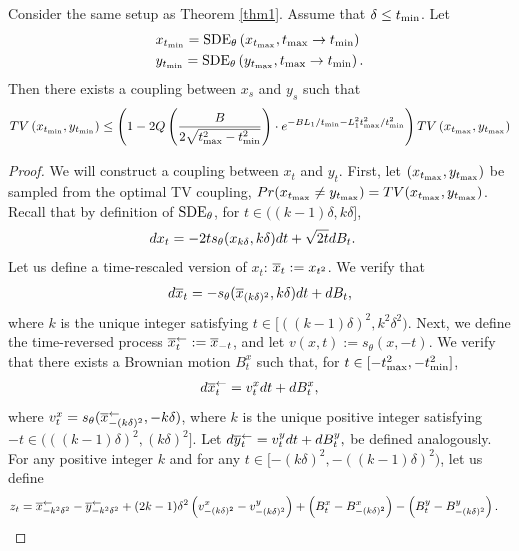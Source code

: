 \begin{lemma}
    \label{l:sde_hitting_time}
    Consider the same setup as Theorem \ref{thm1}. Assume that $\delta \leq t_{\textrm{min}}$. Let
    \begin{align*}
        & x_{t_{\textrm{min}}} = {\textrm{SDE}_\theta}\left( x_{t_{\textrm{max}}}, t_{\textrm{max}} \to t_{\textrm{min}} \right)\\
        & y_{t_{\textrm{min}}} = {\textrm{SDE}_\theta}\left( y_{t_{\textrm{max}}}, t_{\textrm{max}} \to t_{\textrm{min}} \right).
    \end{align*}
    Then there exists a coupling between $x_s$ and $y_s$ such that 
    \begin{align*}
        TV\left( x_{t_{\textrm{min}}}, y_{t_{\textrm{min}}} \right) \leq \left( 1-2Q\left( \frac{B}{2\sqrt{t_{\textrm{max}}^2 - t_{\textrm{min}}^2}} \right) \cdot e^{-BL_1/t_{\textrm{min}} - L_1^2 t_{\textrm{max}}^2 / t_{\textrm{min}}^2} \right) TV\left( x_{t_{\textrm{max}}}, y_{t_{\textrm{max}}} \right)
    \end{align*}
\end{lemma}
\begin{proof}
    We will construct a coupling between $x_t$ and $y_t$. First, let $(x_{t_{\textrm{max}}}, y_{t_{\textrm{max}}})$ be sampled from the optimal TV coupling, \ie $Pr(x_{t_{\textrm{max}}} \neq y_{t_{\textrm{max}}}) = TV(x_{t_{\textrm{max}}}, y_{t_{\textrm{max}}})$. Recall that by definition of ${\textrm{SDE}_\theta}$, for $t\in((k-1)\delta, k\delta]$,
    \begin{align*}
        & d x_t = - 2 t s_{\theta}(x_{k\delta}, k\delta) dt + \sqrt{2t} dB_t.
    \end{align*}
    Let us define a time-rescaled version of $x_t$: $\overline{x}_{t} := x_{t^2}$. We verify that
    \begin{align*}
        d \overline{x}_t = - s_{\theta}(\overline{x}_{(k\delta)^2}, k\delta) dt + dB_t,
    \end{align*}
    where $k$ is the unique integer satisfying $t \in[((k-1)\delta)^2, k^2\delta^2)$.
    Next, we define the time-reversed process $\overline{x}^{\leftarrow}_t:= \overline{x}_{-t}$, and let $v(x,t) := s_{\theta}(x,-t)$. We verify that there exists a Brownian motion $B^x_t$ such that, for $t\in[-t_{\textrm{max}}^2, -t_{\textrm{min}}^2]$,
    \begin{align*}
        d \overline{x}^{\leftarrow}_t = v^x_t dt + dB^x_t,
    \end{align*}
    where $v^x_t = s_{\theta} (\overline{x}^{\leftarrow}_{-(k\delta)^2}, -k\delta)$, where $k$ is the unique positive integer satisfying $-t \in(((k-1)\delta)^2, (k\delta)^2]$. Let 
    $
        d \overline{y}^{\leftarrow}_t = v^y_t dt + dB^y_t,
    $
    be defined analogously. For any positive integer $k$ and for any $t\in [-(k\delta)^2, -((k-1)\delta)^2)$, let us define 
    \begin{align*}
        & z_t = \overline{x}^{\leftarrow}_{-k^2\delta^2} - \overline{y}^{\leftarrow}_{-k^2 \delta^2} + (2k-1)\delta^2 \left( v^x_{-(k\delta)^2}-v^y_{-(k\delta)^2} \right) + \left( B^x_t - B^x_{-(k\delta)^2} \right) - \left( B^y_t - B^y_{-(k\delta)^2} \right).
    \end{align*}


\end{proof}
